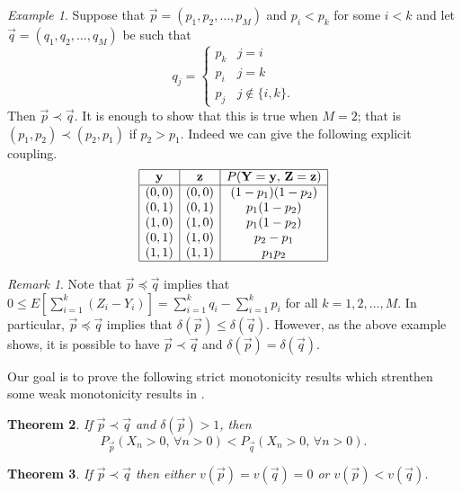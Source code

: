 \documentclass[reqno,letterpaper,11pt]{amsart}
\newtheorem{thm}{Theorem}[section]
\theoremstyle{remark}
\newtheorem{rem}[thm]{Remark}
\newtheorem{ex}{Example}[section]
\theoremstyle{definition}
\begin{document}
\begin{ex}
 Suppose that ${\vec{p}} = (p_1,p_2,\ldots,p_M)$ and $p_{i} < p_{k}$ for some $i < k$ and let ${\vec{q}} = (q_1,q_2,\ldots,q_M)$ be such that 
\[
 q_j = 
\begin{cases}
 p_k & j=i \\
 p_i & j=k \\
 p_j & j \notin\{i,k\}. 
\end{cases}
\]
Then ${\vec{p}} \prec {\vec{q}}$. It is enough to show that this is true when $M=2$; that is $(p_1,p_2) \prec (p_2,p_1)$ if $p_2 > p_1$. Indeed we can give the following explicit coupling.
\[
 \begin{array}{|c|c|c|}
\hline
 \mathbf{y} & \mathbf{z} & P( \mathbf{Y}=\mathbf{y}, \, \mathbf{Z}=\mathbf{z} ) \\
\hline
 (0,0) & (0,0) & (1-p_1)(1-p_2) \\
 (0,1) & (0,1) & p_1(1-p_2) \\
 (1,0) & (1,0) & p_1(1-p_2) \\
 (0,1) & (1,0) & p_2-p_1 \\
 (1,1) & (1,1) & p_1p_2 \\
\hline
\end{array}
\]
\end{ex}

\begin{rem}\label{ineqrem}
 Note that ${\vec{p}} {\preccurlyeq} {\vec{q}}$ implies that $0 \leq E[ \sum_{i=1}^k (Z_i - Y_i)] = \sum_{i=1}^k q_i - \sum_{i=1}^k p_i$ for all $k=1,2,\ldots,M$. In particular, ${\vec{p}} {\preccurlyeq} {\vec{q}}$ implies that $ {\delta}({\vec{p}}) \leq {\delta}({\vec{q}})$. 
However, as the above example shows, it is possible to have ${\vec{p}} \prec {\vec{q}}$ and ${\delta}({\vec{p}}) = {\delta}({\vec{q}})$. 
\end{rem}

Our goal is to prove the following strict monotonicity results which strenthen some weak monotonicity results in \cite{hsCombinatorial}. 

\begin{thm}\label{Transmono}
 If $\vec{p} \prec \vec{q}$ and ${\delta}({\vec{p}}) > 1$, then 
\[
 P_{\vec{p}}( X_n > 0, \, \forall n>0) < P_{\vec{q}}( X_n > 0, \, \forall n>0).
\]
\end{thm}

\begin{thm}\label{Speedmono}
 If $\vec{p} \prec \vec{q}$ then either $v({\vec{p}}) = v({\vec{q}}) = 0$ or $v({\vec{p}}) < v({\vec{q}})$.
\end{thm}
\end{document}
